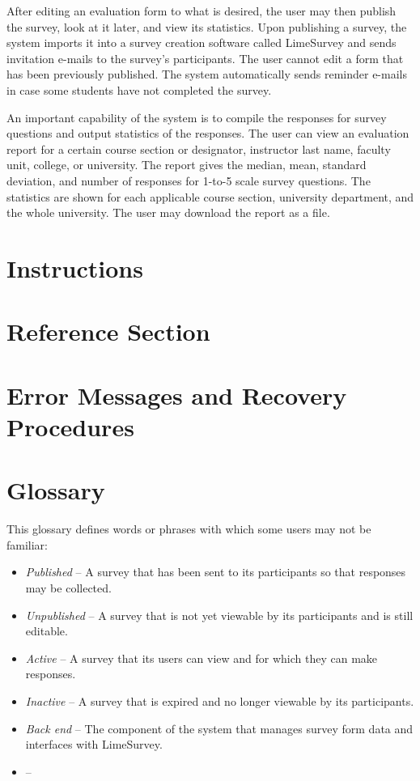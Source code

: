 \documentclass{article}
\begin{document}
After editing an evaluation form to what is desired, the user may then publish the survey, look at it later, and view its statistics. Upon publishing a survey, the system imports it into a survey creation software called LimeSurvey and sends invitation e-mails to the survey's participants. The user cannot edit a form that has been previously published. The system automatically sends reminder e-mails in case some students have not completed the survey.

An important capability of the system is to compile the responses for survey questions and output statistics of the responses. The user can view an evaluation report for a certain course section or designator, instructor last name, faculty unit, college, or university. The report gives the median, mean, standard deviation, and number of responses for 1-to-5 scale survey questions. The statistics are shown for each applicable course section, university department, and the whole university. The user may download the report as a file.

\section{Instructions}



\section{Reference Section}



\appendix

\newpage
\section{Error Messages and Recovery Procedures}



\section{Glossary}

This glossary defines words or phrases with which some users may not be familiar:

\begin{itemize}
 \item \textit{Published} -- A survey that has been sent to its participants so that responses may be collected.
 \item \textit{Unpublished} -- A survey that is not yet viewable by its participants and is still editable.
 \item \textit{Active} -- A survey that its users can view and for which they can make responses.
 \item \textit{Inactive} -- A survey that is expired and no longer viewable by its participants.
 \item \textit{Back end} -- The component of the system that manages survey form data and interfaces with LimeSurvey.
 \item \textit{} -- 
\end{itemize}
\end{document}
